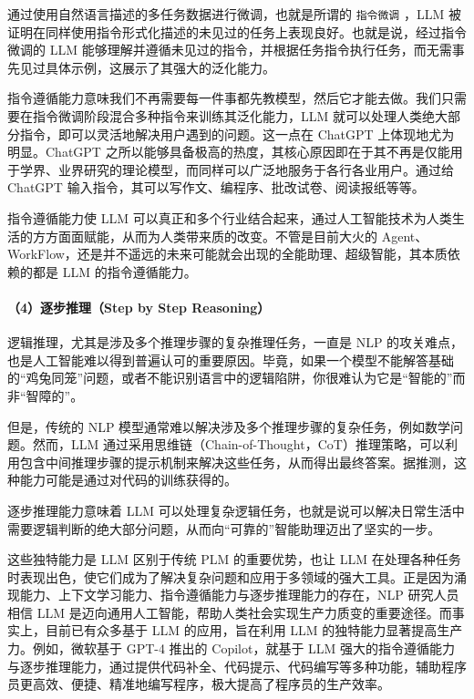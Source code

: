 \documentclass[12pt,a4paper]{book}
\begin{document}
通过使用自然语言描述的多任务数据进行微调，也就是所谓的 \texttt{指令微调}
，LLM
被证明在同样使用指令形式化描述的未见过的任务上表现良好。也就是说，经过指令微调的
LLM
能够理解并遵循未见过的指令，并根据任务指令执行任务，而无需事先见过具体示例，这展示了其强大的泛化能力。

指令遵循能力意味我们不再需要每一件事都先教模型，然后它才能去做。我们只需要在指令微调阶段混合多种指令来训练其泛化能力，LLM
就可以处理人类绝大部分指令，即可以灵活地解决用户遇到的问题。这一点在
ChatGPT 上体现地尤为明显。ChatGPT
之所以能够具备极高的热度，其核心原因即在于其不再是仅能用于学界、业界研究的理论模型，而同样可以广泛地服务于各行各业用户。通过给
ChatGPT 输入指令，其可以写作文、编程序、批改试卷、阅读报纸等等。

指令遵循能力使 LLM
可以真正和多个行业结合起来，通过人工智能技术为人类生活的方方面面赋能，从而为人类带来质的改变。不管是目前大火的
Agent、WorkFlow，还是并不遥远的未来可能就会出现的全能助理、超级智能，其本质依赖的都是
LLM 的指令遵循能力。

\paragraph{（4）逐步推理（Step by Step
Reasoning）}\label{ux9010ux6b65ux63a8ux7406step-by-step-reasoning}

逻辑推理，尤其是涉及多个推理步骤的复杂推理任务，一直是 NLP
的攻关难点，也是人工智能难以得到普遍认可的重要原因。毕竟，如果一个模型不能解答基础的``鸡兔同笼''问题，或者不能识别语言中的逻辑陷阱，你很难认为它是``智能的''而非``智障的''。

但是，传统的 NLP
模型通常难以解决涉及多个推理步骤的复杂任务，例如数学问题。然而，LLM
通过采用思维链（Chain-of-Thought，CoT）推理策略，可以利用包含中间推理步骤的提示机制来解决这些任务，从而得出最终答案。据推测，这种能力可能是通过对代码的训练获得的。

逐步推理能力意味着 LLM
可以处理复杂逻辑任务，也就是说可以解决日常生活中需要逻辑判断的绝大部分问题，从而向``可靠的''智能助理迈出了坚实的一步。

这些独特能力是 LLM 区别于传统 PLM 的重要优势，也让 LLM
在处理各种任务时表现出色，使它们成为了解决复杂问题和应用于多领域的强大工具。正是因为涌现能力、上下文学习能力、指令遵循能力与逐步推理能力的存在，NLP
研究人员相信 LLM
是迈向通用人工智能，帮助人类社会实现生产力质变的重要途径。而事实上，目前已有众多基于
LLM 的应用，旨在利用 LLM 的独特能力显著提高生产力。例如，微软基于 GPT-4
推出的 Copilot，就基于 LLM
强大的指令遵循能力与逐步推理能力，通过提供代码补全、代码提示、代码编写等多种功能，辅助程序员更高效、便捷、精准地编写程序，极大提高了程序员的生产效率。
\end{document}
